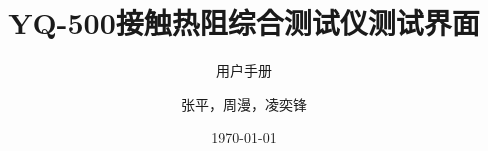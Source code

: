 \documentclass[cn,11pt]{MyElegantbook}
\title{YQ-500接触热阻综合测试仪测试界面}
\subtitle{用户手册}
\author{张平，周漫，凌奕锋}
\date{\today}
\begin{document}
\setcounter{page}{1}
\maketitle
\tableofcontents


\mainmatter
\hypersetup{pageanchor=true}











\nocite{*}



\begin{appendices}
    
    
    
    
\end{appendices}
\end{document}
